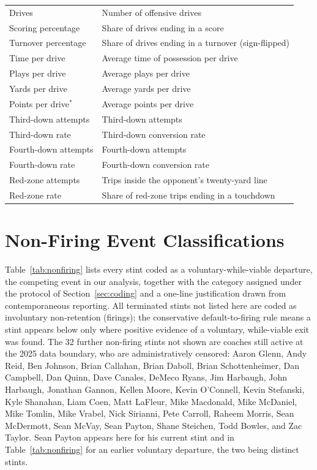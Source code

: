 \documentclass[USenglish]{article}
\theoremstyle{dgthm}
\theoremstyle{dgdef}
\begin{document}
{\begin{longtable}{@{}l l@{}}
Drives & Number of offensive drives \\
Scoring percentage & Share of drives ending in a score \\
Turnover percentage & Share of drives ending in a turnover (sign-flipped) \\
Time per drive & Average time of possession per drive \\
Plays per drive & Average plays per drive \\
Yards per drive & Average yards per drive \\
Points per drive$^{\ast}$ & Average points per drive \\
Third-down attempts & Third-down attempts \\
Third-down rate & Third-down conversion rate \\
Fourth-down attempts & Fourth-down attempts \\
Fourth-down rate & Fourth-down conversion rate \\
Red-zone attempts & Trips inside the opponent's twenty-yard line \\
Red-zone rate & Share of red-zone trips ending in a touchdown \\
\end{longtable}
}

\section{Non-Firing Event Classifications}
\label{app:nonfiring}

Table~\ref{tab:nonfiring} lists every stint coded as a voluntary-while-viable departure, the competing event in our analysis, together with the category assigned under the protocol of Section~\ref{sec:coding} and a one-line justification drawn from contemporaneous reporting. All terminated stints not listed here are coded as involuntary non-retention (firings); the conservative default-to-firing rule means a stint appears below only where positive evidence of a voluntary, while-viable exit was found. The 32 further non-firing stints not shown are coaches still active at the 2025 data boundary, who are administratively censored: Aaron Glenn, Andy Reid, Ben Johnson, Brian Callahan, Brian Daboll, Brian Schottenheimer, Dan Campbell, Dan Quinn, Dave Canales, DeMeco Ryans, Jim Harbaugh, John Harbaugh, Jonathan Gannon, Kellen Moore, Kevin O'Connell, Kevin Stefanski, Kyle Shanahan, Liam Coen, Matt LaFleur, Mike Macdonald, Mike McDaniel, Mike Tomlin, Mike Vrabel, Nick Sirianni, Pete Carroll, Raheem Morris, Sean McDermott, Sean McVay, Sean Payton, Shane Steichen, Todd Bowles, and Zac Taylor. Sean Payton appears here for his current stint and in Table~\ref{tab:nonfiring} for an earlier voluntary departure, the two being distinct stints.
\end{document}
